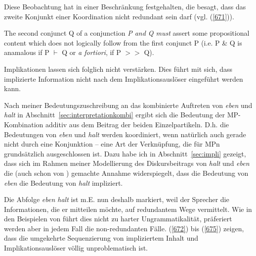 Diese Beobachtung hat \citet{Horn1976} in einer Beschränkung festgehalten, die besagt, dass das zweite Konjunkt einer Koordination nicht redundant sein darf (vgl. (\ref{671})).

\begin{exe}
	\ex\label{671} 
	The second conjunct Q of a conjunction \textit{P and Q must} assert some propositional content which does not logically 		follow from the first conjunct P (i.e. P \& Q is anamalous if P $\vdash$ Q or \textit{a fortiori}, if P $>>$ Q).	
	\hfill\hbox {\citet[65]{Horn1976}}
\end{exe}	
Implikationen lassen sich folglich nicht verstärken. Dies führt mit sich, dass implizierte Information nicht nach dem Implikationsauslöser eingeführt werden kann. 

Nach meiner Bedeutungszuschreibung an das kombinierte Auftreten von \textit{eben} und \textit{halt} in Abschnitt~\ref{sec:interpretationkombi} ergibt sich die Bedeutung der MP-Kombination additiv aus dem Beitrag der beiden Einzelpartikeln. D.h. die Bedeutungen von \textit{eben} und \textit{halt} werden koordiniert, wenn natürlich auch gerade nicht durch eine Konjunktion – eine Art der Verknüpfung, die für MPn grundsätzlich ausgeschlossen ist. Dazu habe ich in Abschnitt~\ref{sec:impli} gezeigt, dass sich im Rahmen meiner Mo\-dellierung des Diskursbeitrags von \textit{halt} und \textit{eben} die (auch schon von \citealt{Thurmair1989}) gemachte Annahme widerspiegelt, dass die Bedeutung von \textit{eben} die Bedeutung von \textit{halt} impliziert.

Die Abfolge \textit{eben halt} ist m.E. nun deshalb markiert, weil der Sprecher die Informationen, die er mitteilen möchte, auf redundantem  Wege vermittelt. Wie in den Beispielen von \citet{Horn1976} führt dies nicht zu harter Ungrammatikalität, präferiert werden aber in jedem Fall die non-redundanten Fälle. (\ref{672}) bis (\ref{675}) zeigen, dass die umgekehrte Sequenzierung von impliziertem Inhalt und Implikationsauslöser völlig unproblematisch ist.


